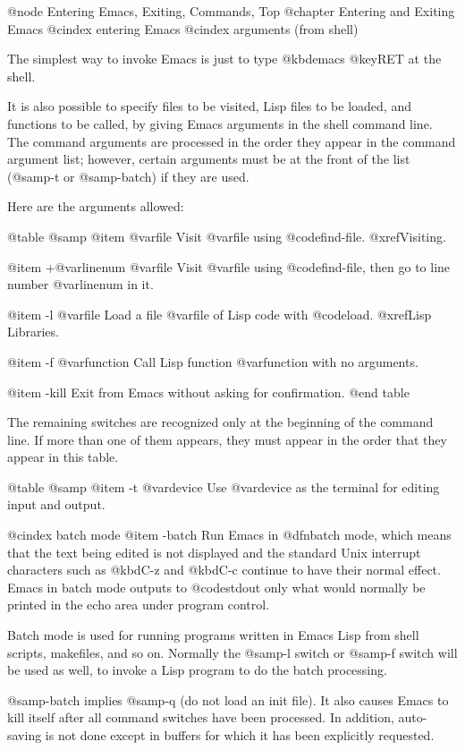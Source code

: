 {{@node Entering Emacs, Exiting, Commands, Top
@chapter Entering and Exiting Emacs
@cindex entering Emacs
@cindex arguments (from shell)

  The simplest way to invoke Emacs is just to type @kbd{emacs @key{RET}}
at the shell.

  It is also possible to specify files to be visited, Lisp files to be
loaded, and functions to be called, by giving Emacs arguments in the
shell command line.  The command arguments are processed in the order they
appear in the command argument list; however, certain arguments must be at
the front of the list (@samp{-t} or @samp{-batch}) if they are used.

  Here are the arguments allowed:

@table @samp
@item @var{file}
Visit @var{file} using @code{find-file}.  @xref{Visiting}.

@item +@var{linenum} @var{file}
Visit @var{file} using @code{find-file}, then go to line number
@var{linenum} in it.

@item -l @var{file}
Load a file @var{file} of Lisp code with @code{load}.  @xref{Lisp
Libraries}.

@item -f @var{function}
Call Lisp function @var{function} with no arguments.

@item -kill
Exit from Emacs without asking for confirmation.
@end table

  The remaining switches are recognized only at the beginning of the
command line.  If more than one of them appears, they must appear in the
order that they appear in this table.

@table @samp
@item -t @var{device}
Use @var{device} as the terminal for editing input and output.

@cindex batch mode
@item -batch
Run Emacs in @dfn{batch mode}, which means that the text being edited is
not displayed and the standard Unix interrupt characters such as @kbd{C-z}
and @kbd{C-c} continue to have their normal effect.  Emacs in batch mode
outputs to @code{stdout} only what would normally be printed in the echo
area under program control.

Batch mode is used for running programs written in Emacs Lisp from
shell scripts, makefiles, and so on.  Normally the @samp{-l} switch
or @samp{-f} switch will be used as well, to invoke a Lisp program
to do the batch processing.

@samp{-batch} implies @samp{-q} (do not load an init file).  It also causes
Emacs to kill itself after all command switches have been processed.  In
addition, auto-saving is not done except in buffers for which it has been
explicitly requested.

}}
